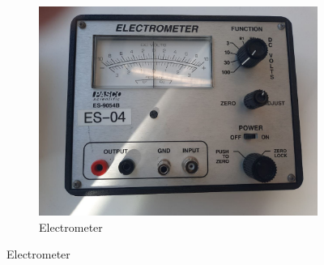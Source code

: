 \begin{figure}[H]
\begin{subfigure}[b]{0.33\textwidth}
        \includegraphics[width=\textwidth]{capacitors/img/setup/electrometer.jpg}
        \caption{Electrometer}
    \end{subfigure}
    
    \vspace{0.5cm}
    

\end{figure}
